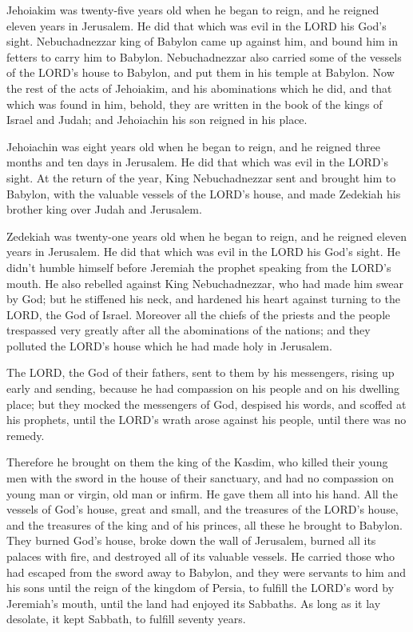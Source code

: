 \myverse{}Jehoiakim was twenty-five years old when he began to reign, and
he reigned eleven years in Jerusalem. He did that which was evil in the LORD his God’s sight.
\myverse{}Nebuchadnezzar king of Babylon came up against him, and bound him in fetters
to carry him to Babylon.
\myverse{}Nebuchadnezzar also carried some of the vessels of the LORD’s house to Babylon,
and put them in his temple at Babylon.
\myverse{}Now the rest of the acts of Jehoiakim, and his abominations which he did, and
that which was found in him, behold, they are written in the book of the kings of Israel and Judah; and
Jehoiachin his son reigned in his place.

\myverse{}Jehoiachin was eight years old when he began to reign, and he
reigned three months and ten days in Jerusalem. He did that which was evil in the LORD’s sight.
\myverse{}At the return of the year, King Nebuchadnezzar sent and brought him to Babylon,
with the valuable vessels of the LORD’s house, and made Zedekiah his brother king over Judah and Jerusalem.

\myverse{}Zedekiah was twenty-one years old when he began to reign, and
he reigned eleven years in Jerusalem.
\myverse{}He did that which was evil in the LORD his God’s sight. He didn’t humble
himself before Jeremiah the prophet speaking from the LORD’s mouth.
\myverse{}He also rebelled against King Nebuchadnezzar, who had made him swear by God;
but he stiffened his neck, and hardened his heart against turning to the LORD, the God of Israel.
\myverse{}Moreover all the chiefs of the priests and the people trespassed very greatly
after all the abominations of the nations; and they polluted the LORD’s house which he had made holy in
Jerusalem.

\myverse{}The LORD, the God of their fathers, sent to them by his messengers,
rising up early and sending, because he had compassion on his people and on his dwelling place;
\myverse{}but they mocked the messengers of God, despised his words, and scoffed at
his prophets, until the LORD’s wrath arose against his people, until there was no remedy.

\myverse{}Therefore he brought on them the king of the Kasdim, who killed
their young men with the sword in the house of their sanctuary, and had no compassion on young man or
virgin, old man or infirm. He gave them all into his hand.
\myverse{}All the vessels of God’s house, great and small, and the treasures of the
LORD’s house, and the treasures of the king and of his princes, all these he brought to Babylon.
\myverse{}They burned God’s house, broke down the wall of Jerusalem, burned all its
palaces with fire, and destroyed all of its valuable vessels.
\myverse{}He carried those who had escaped from the sword away to Babylon, and they
were servants to him and his sons until the reign of the kingdom of Persia,
\myverse{}to fulfill the LORD’s word by Jeremiah’s mouth, until the land had enjoyed
its Sabbaths. As long as it lay desolate, it kept Sabbath, to fulfill seventy years.

